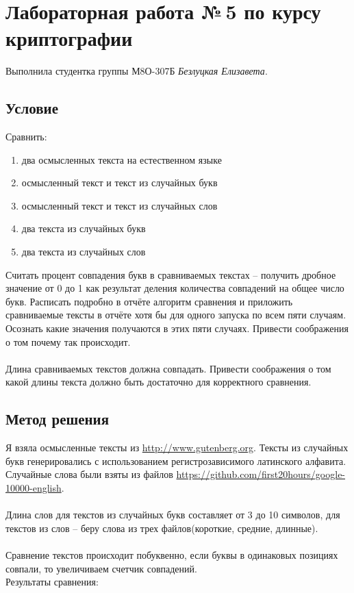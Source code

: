 \documentclass[12pt]{article}
\begin{document}
\section*{Лабораторная работа №\,5 по курсу криптографии}

Выполнила студентка группы М8О-307Б \textit{Безлуцкая Елизавета}.

\subsection*{Условие}
Сравнить:
\begin{enumerate}
\item два осмысленных текста на естественном языке
\item осмысленный текст и текст
из случайных букв
\item осмысленный текст и текст из случайных слов
\item два текста из
случайных букв
\item два текста из случайных слов
\end{enumerate}
\noindent
Считать процент совпадения букв в сравниваемых текстах – получить дробное значение от 0
до 1 как результат деления количества совпадений на общее число букв. Расписать подробно
в отчёте алгоритм сравнения и приложить сравниваемые тексты в отчёте хотя бы для одного
запуска по всем пяти случаям. Осознать какие значения получаются в этих пяти случаях.
Привести соображения о том почему так происходит.\\
\\
Длина сравниваемых текстов должна совпадать. Привести соображения о том какой длины
текста должно быть достаточно для корректного сравнения.

\subsection*{Метод решения}
Я взяла осмысленные тексты из \href{http://www.gutenberg.org}{http://www.gutenberg.org}. Тексты из случайных букв генерировались с использованием регистрозависимого латинского алфавита. Случайные слова были взяты из файлов \href{https://github.com/first20hours/google-10000-english}{https://github.com/first20hours/google-10000-english}.\\
\\
Длина слов для текстов из случайных букв составляет от 3 до 10 символов, для текстов из слов -- беру слова из трех файлов(короткие, средние, длинные).\\
\\
Сравнение текстов происходит побуквенно, если буквы в одинаковых позициях совпали, то увеличиваем счетчик совпадений. 
\\
Результаты сравнения:\\
\end{document}

